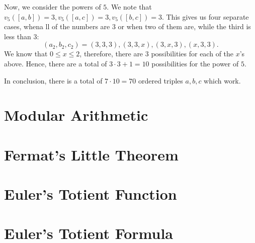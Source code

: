 Now, we consider the powers of $5$. We note that $v_5([a,b])=3, v_5([a,c])=3, v_5([b,c])=3$. This gives us four separate cases, whena ll of the numbers are $3$ or when two of them are, while the third is less than $3$: $$(a_2, b_2, c_2)=(3,3,3), (3,3,x), (3,x, 3), (x,3,3).$$ We know that $0\le x\le 2$, therefore, there are $3$ possibilities for each of the $x$'s above. Hence, there are a total of $3\cdot 3+1=10$ possibilities for the power of $5$.

In conclusion, there is a total of $7\cdot 10=\boxed{70}$ ordered triples $a,b,c$ which work.  
\clearpage

\section{Modular Arithmetic}
\clearpage

\section{Fermat's Little Theorem}
\clearpage

\section{Euler's Totient Function}
\clearpage

\section{Euler's Totient Formula}  





\clearpage
\thispagestyle{empty} %



\clearpage






